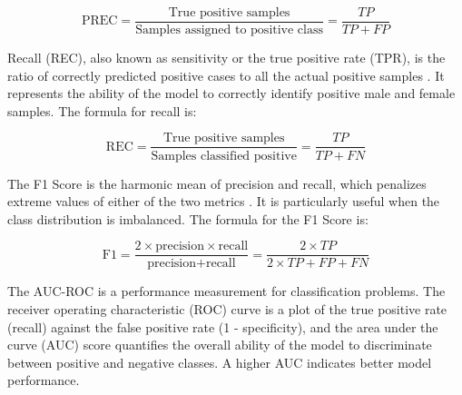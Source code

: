 \begin{equation}
	\text{PREC} = \frac{\text{True positive samples}}{\text{Samples assigned to positive class}} = \frac{TP}{TP + FP}
	\label{eq:prec}
\end{equation}

Recall (REC), also known as sensitivity or the true positive rate (TPR), is the ratio of correctly predicted positive cases to all the actual positive samples \cite{cui2020}. It represents the ability of the model to correctly identify positive male and female samples. The formula for recall is:

\begin{equation}
	\text{REC} = \frac{\text{True positive samples}}{\text{Samples classified positive}} = \frac{TP}{TP + FN}
	\label{eq:rec}
\end{equation}

The F1 Score is the harmonic mean of precision and recall, which penalizes extreme values of either of the two metrics \cite{cui2020}. It is particularly useful when the class distribution is imbalanced. The formula for the F1 Score is:

\begin{equation}
	\text{F1} = \frac{2 \times \text{precision} \times \text{recall}}{\text{precision} + \text{recall}} = \frac{2 \times TP}{2 \times TP + FP + FN}
	\label{eq:f1}
\end{equation}

The AUC-ROC is a performance measurement for classification problems. The receiver operating characteristic (ROC) curve is a plot of the true positive rate (recall) against the false positive rate (1 - specificity), and the area under the curve (AUC) score quantifies the overall ability of the model to discriminate between positive and negative classes. A higher AUC indicates better model performance. \cite{nahm2022} 